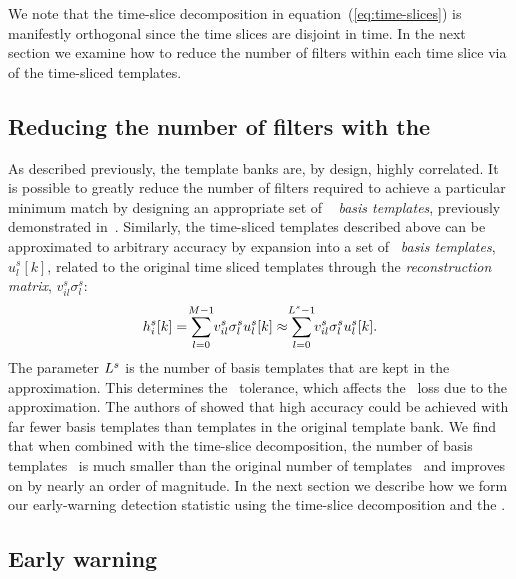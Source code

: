 We note that the time-slice decomposition in equation~(\ref{eq:time-slices}) is
manifestly orthogonal since the time slices are disjoint in time.  In the next
section we examine how to reduce the number of filters within each time slice
via \SVD{} of the time-sliced templates.

\subsection{Reducing the number of filters with the \SVD{}}

As described previously, the template banks are, by design, highly correlated.
It is possible to greatly reduce the number of filters required to achieve a
particular minimum match by designing an appropriate set of \SVD\ {\em
basis templates}, previously demonstrated
in~\citep{Cannon:2010p10398}.  Similarly, the time-sliced templates described
above can be approximated to arbitrary accuracy by expansion into a set of
\SVD\ \emph{basis templates}, $u_l^s[k]$, related to the original time
sliced templates through the \emph{reconstruction matrix},
$v_{il}^s\sigma_l^s$:
%
\begin{equation}
h_i^s[k] = \sum_{\mathclap{l=0}}^{\mathclap{M-1}} v_{il}^s \sigma_l^s u_l^s[k] \approx \sum_{\mathclap{l=0}}^{\mathclap{L^s-1}} v_{il}^s \sigma_l^s u_l^s[k].
\label{eq:svddecomp}
\end{equation}
%
The parameter $L^s$ is the number of basis templates that are kept in
the approximation.  This determines the \SVD\ tolerance, which affects the
\SNR\ loss due to the approximation.  The authors of \citep{Cannon:2010p10398}
showed that high accuracy could be achieved with far fewer basis templates than
templates in the original template bank.  We find that when combined with the
time-slice decomposition, the number of basis templates \numsvdtmps\ is much
smaller than the original number of templates \numtmps\ and improves on
\citep{Cannon:2010p10398} by nearly an order of magnitude.  In the next section
we describe how we form our early-warning detection statistic using the time-slice
decomposition and the \SVD.

\subsection{Early warning \SNR }

